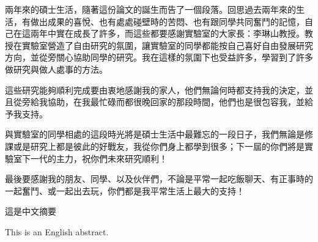 \NTUtitlepage  %

\newpage
\setcounter{page}{1}

\NTUoralpage  %

\mydoublespacing
\begin{acknowledgement} %
    兩年來的碩士生活，隨著這份論文的誕生而告了一個段落。回思過去兩年來的生活，有做出成果的喜悅、也有處處碰壁時的苦悶、也有跟同學共同奮鬥的記憶，自己在這兩年中實在成長了許多，而這些都要感謝實驗室的大家長：李琳山教授。教授在實驗室營造了自由研究的氛圍，讓實驗室的同學都能按自己喜好自由發展研究方向，並從旁關心協助同學的研究。我在這樣的氛圍下也受益許多，學習到了許多做研究與做人處事的方法。

    這些研究能夠順利完成要由衷地感謝我的家人，他們無論何時都支持我的決定，並且從旁給我協助，在我最忙碌而都很晚回家的那段時間，他們也是很包容我，並給予我支持。

    與實驗室的同學相處的這段時光將是碩士生活中最難忘的一段日子，我們無論是修課或是研究上都是彼此的好戰友，我從你們身上都學到很多；下一屆的你們將是實驗室下一代的主力，祝你們未來研究順利！

    最後要感謝我的朋友、同學、以及伙伴們，不論是平常一起吃飯聊天、有正事時的一起奮鬥、或一起出去玩，你們都是我平常生活上最大的支持！

\end{acknowledgement}

\begin{zhAbstract} %
    這是中文摘要
\end{zhAbstract}

\begin{enAbstract} %
    This is an English abstract.
\end{enAbstract}

{
\mysinglespacing\selectfont
\tableofcontents %

\listoffigures  %

\listoftables  %
\par
}

\newpage
\setcounter{page}{1}

